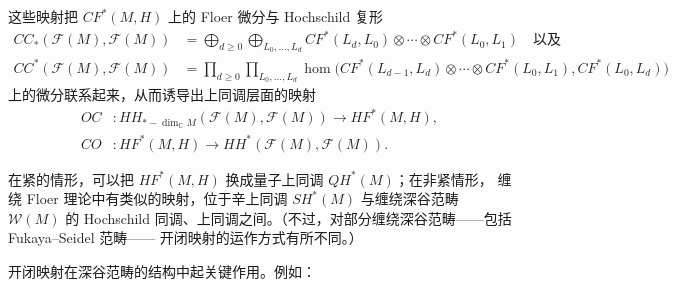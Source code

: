 \documentclass[UTF8,a4paper,11pt,fontset=windows]{ctexart}
\theoremstyle{cnthm}
\numberwithin{equation}{section}
\newcommand{\C}{\mathbb{C}}
\newcommand{\KK}{\mathbb{K}}          %
\newcommand{\CF}{CF}                  %
\newcommand{\HF}{HF}                  %
\newcommand{\SH}{SH}                  %
\newcommand{\HH}{HH}                  %
\newcommand{\CC}{CC}                  %
\newcommand{\WW}{\mathcal{W}}         %
\newcommand{\FF}{\mathcal{F}}         %
\begin{document}
\smallskip


这些映射把 $\CF^{*}(M,H)$ 上的 Floer 微分与 Hochschild 复形
\begin{align*}
\CC_{*}(\FF(M),\FF(M))&=\bigoplus_{d\ge0}\bigoplus_{L_0,\dots,L_d}
\CF^{*}(L_d,L_0)\otimes\cdots\otimes\CF^{*}(L_0,L_1)\quad\text{以及}\\
\CC^{*}(\FF(M),\FF(M))&=\prod_{d\ge0}\prod_{L_0,\dots,L_d}
\hom\bigl(\CF^{*}(L_{d-1},L_d)\otimes\cdots\otimes\CF^{*}(L_0,L_1),\CF^{*}(L_0,L_d)\bigr)
\end{align*}
上的微分联系起来，从而诱导出上同调层面的映射
\begin{equation}\label{eq:2.8}
\begin{aligned}
OC&:\HH_{*-\dim_{\C}M}(\FF(M),\FF(M))\to\HF^{*}(M,H),\\
CO&:\HF^{*}(M,H)\to\HH^{*}(\FF(M),\FF(M)).
\end{aligned}
\end{equation}

在紧的情形，可以把 $\HF^{*}(M,H)$ 换成量子上同调 $QH^{*}(M)$；在非紧情形，
缠绕 Floer 理论中有类似的映射，位于辛上同调 $\SH^{*}(M)$ 与缠绕深谷范畴 $\WW(M)$ 的
Hochschild 同调、上同调之间。（不过，对部分缠绕深谷范畴——包括 Fukaya--Seidel 范畴——
开闭映射的运作方式有所不同。）

开闭映射在深谷范畴的结构中起关键作用。例如：
\end{document}
